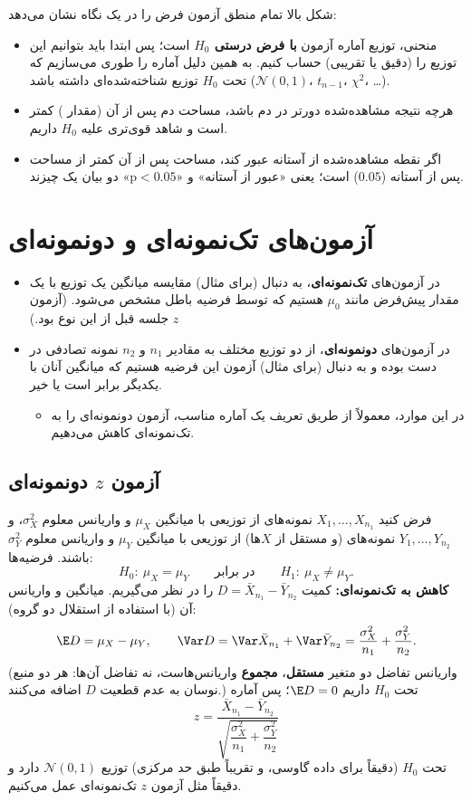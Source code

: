 شکل بالا تمام منطق آزمون فرض را در یک نگاه نشان می‌دهد:
\begin{itemize}
\item منحنی، توزیع آماره آزمون \textbf{با فرض درستی $H_0$} است؛ پس ابتدا باید بتوانیم این توزیع را (دقیق یا تقریبی) حساب کنیم. به همین دلیل آماره را طوری می‌سازیم که تحت $H_0$ توزیع شناخته‌شده‌ای داشته باشد ($\mathcal N(0,1)$، $t_{n-1}$، $\chi^2$، \ldots).
\item هرچه نتیجه مشاهده‌شده دورتر در دم باشد، مساحت دم پس از آن (مقدار ) کمتر است و شاهد قوی‌تری علیه $H_0$ داریم.
\item اگر نقطه مشاهده‌شده از آستانه عبور کند، مساحت پس از آن کمتر از مساحت پس از آستانه ($0.05$) است؛ یعنی «عبور از آستانه» و «$\text{p}<0.05$» دو بیان یک چیزند.
\end{itemize}

\section{آزمون‌های تک‌نمونه‌ای و دونمونه‌ای }
\begin{itemize}
\item در آزمون‌های \textbf{تک‌نمونه‌ای}، به دنبال (برای مثال) مقایسه میانگین یک توزیع با یک مقدار پیش‌فرض مانند $\mu_0$ هستیم که توسط فرضیه باطل  مشخص می‌شود. (آزمون $z$ جلسه قبل از این نوع بود.)
\item در آزمون‌های \textbf{دونمونه‌ای}، از دو توزیع مختلف به مقادیر $n_1$ و $n_2$ نمونه تصادفی در دست بوده و به دنبال (برای مثال) آزمون این فرضیه هستیم که میانگین آنان با یکدیگر برابر است یا خیر.
\begin{itemize}
\item در این موارد، معمولاً از طریق تعریف یک آماره مناسب، آزمون دونمونه‌ای را به تک‌نمونه‌ای کاهش می‌دهیم.
\end{itemize}
\end{itemize}

\subsection{آزمون $z$ دونمونه‌ای}
فرض کنید $X_1,\ldots,X_{n_1}$ نمونه‌های  از توزیعی با میانگین $\mu_X$ و واریانس معلوم $\sigma_X^2$، و $Y_1,\ldots,Y_{n_2}$ نمونه‌های  (و مستقل از $X$ها) از توزیعی با میانگین $\mu_Y$ و واریانس معلوم $\sigma_Y^2$ باشند. فرضیه‌ها:
\[
H_0:\ \mu_X=\mu_Y\qquad\text{در برابر}\qquad H_1:\ \mu_X\neq\mu_Y .
\]
\textbf{کاهش به تک‌نمونه‌ای:} کمیت $D=\bar X_{n_1}-\bar Y_{n_2}$ را در نظر می‌گیریم. میانگین و واریانس آن (با استفاده از استقلال دو گروه):
\[
\E D=\mu_X-\mu_Y,\qquad \Var D=\Var\bar X_{n_1}+\Var\bar Y_{n_2}=\frac{\sigma_X^2}{n_1}+\frac{\sigma_Y^2}{n_2}.
\]
(واریانس تفاضل دو متغیر \textbf{مستقل}، \textbf{مجموع} واریانس‌هاست، نه تفاضل آن‌ها: هر دو منبع نوسان به عدم قطعیت $D$ اضافه می‌کنند.) تحت $H_0$ داریم $\E D=0$؛ پس آماره
\[
\boxed{\ z=\frac{\bar X_{n_1}-\bar Y_{n_2}}{\sqrt{\dfrac{\sigma_X^2}{n_1}+\dfrac{\sigma_Y^2}{n_2}}}\ }
\]
تحت $H_0$ (دقیقاً برای داده گاوسی، و تقریباً طبق حد مرکزی) توزیع $\mathcal N(0,1)$ دارد و دقیقاً مثل آزمون $z$ تک‌نمونه‌ای عمل می‌کنیم.

